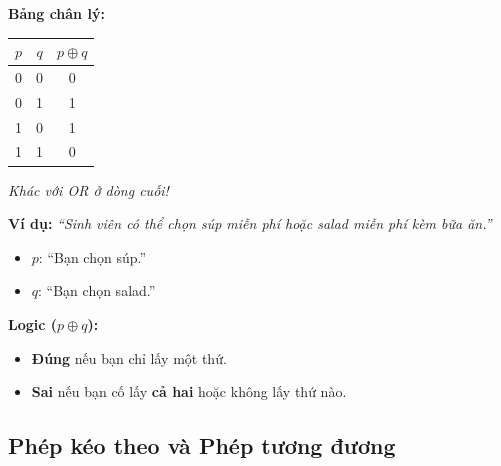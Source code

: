 \documentclass[12pt,a4paper]{article}
\begin{document}
\noindent
\begin{minipage}[t]{0.38\textwidth}
\textbf{Bảng chân lý:}
\begin{center}
\renewcommand{\arraystretch}{1.2}
\begin{tabular}{|c|c|c|}
\hline
$p$ & $q$ & $p \oplus q$ \\ \hline
0 & 0 & 0 \\ \hline
0 & 1 & 1 \\ \hline
1 & 0 & 1 \\ \hline
1 & 1 & 0 \\ \hline
\end{tabular}
\end{center}
\textit{Khác với OR ở dòng cuối!}
\end{minipage}
\hfill
\begin{minipage}[t]{0.58\textwidth}
\textbf{Ví dụ:} \textit{``Sinh viên có thể chọn súp miễn phí hoặc salad miễn phí kèm bữa ăn.''}
\begin{itemize}
  \item $p$: ``Bạn chọn súp.''
  \item $q$: ``Bạn chọn salad.''
\end{itemize}
\textbf{Logic ($p \oplus q$):}
\begin{itemize}
  \item \textbf{Đúng} nếu bạn chỉ lấy một thứ.
  \item \textbf{Sai} nếu bạn cố lấy \textbf{cả hai} hoặc không lấy thứ nào.
\end{itemize}
\end{minipage}

\subsection{Phép kéo theo và Phép tương đương}
\end{document}

